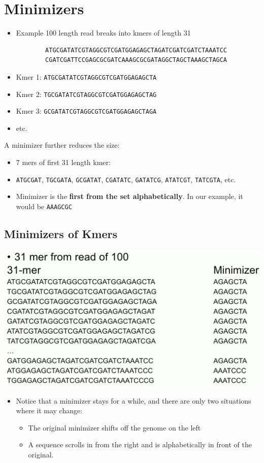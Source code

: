 \documentclass[10pt]{article}
\begin{document}
\section*{Minimizers}
\begin{itemize}
    \item Example 100 length read breaks into kmers of length 31
    \begin{verbatim}
        ATGCGATATCGTAGGCGTCGATGGAGAGCTAGATCGATCGATCTAAATCC
        CGATCGATTCCGAGCGCGATCAAAGCGCGATAGGCTAGCTAAAGCTAGCA
    \end{verbatim}
    \item Kmer 1:  \texttt{ATGCGATATCGTAGGCGTCGATGGAGAGCTA}
    \item Kmer 2:  \texttt{TGCGATATCGTAGGCGTCGATGGAGAGCTAG}
    \item Kmer 3:  \texttt{GCGATATCGTAGGCGTCGATGGAGAGCTAGA}
    \item etc.
\end{itemize}
A minimizer further reduces the size:
\begin{itemize}
    \item 7 mers of first 31 length kmer:
    \item \texttt{ATGCGAT}, \texttt{TGCGATA}, \texttt{GCGATAT}, \texttt{CGATATC}, \texttt{GATATCG}, \texttt{ATATCGT}, \texttt{TATCGTA}, etc.
    \item Minimizer is the \textbf{first from the set alphabetically}.  In our example, it would be \texttt{AAAGCGC}
\end{itemize}
\subsection*{Minimizers of Kmers}
\begin{center}
    \includegraphics*[width=\textwidth]{W2_4.png}
\end{center}
\begin{itemize}
    \item Notice that a minimizer stays for a while, and there are only two situations where it may change:
    \begin{itemize}
        \item The original minimizer shifts off the genome on the left
        \item A sequence scrolls in from the right and is alphabetically in front of the original.
    \end{itemize}
\end{itemize}
\end{document}
